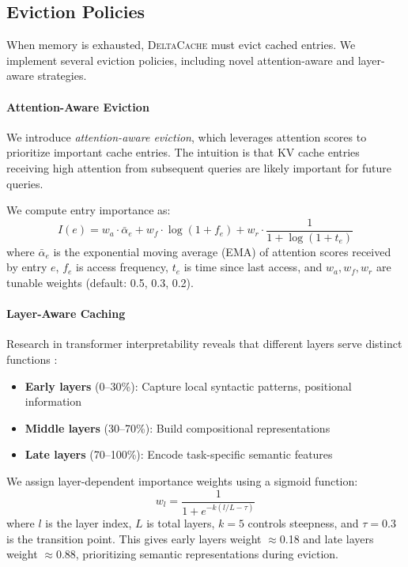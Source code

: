 \documentclass{article}
\newcommand{\deltacache}{\textsc{DeltaCache}}
\begin{document}
\subsection{Eviction Policies}

When memory is exhausted, \deltacache{} must evict cached entries.
We implement several eviction policies, including novel attention-aware and layer-aware strategies.

\paragraph{Attention-Aware Eviction}
We introduce \emph{attention-aware eviction}, which leverages attention scores to prioritize important cache entries.
The intuition is that KV cache entries receiving high attention from subsequent queries are likely important for future queries.

We compute entry importance as:
\begin{equation}
    I(e) = w_a \cdot \bar{\alpha}_e + w_f \cdot \log(1 + f_e) + w_r \cdot \frac{1}{1 + \log(1 + t_e)}
\end{equation}
where $\bar{\alpha}_e$ is the exponential moving average (EMA) of attention scores received by entry $e$, $f_e$ is access frequency, $t_e$ is time since last access, and $w_a, w_f, w_r$ are tunable weights (default: 0.5, 0.3, 0.2).

\paragraph{Layer-Aware Caching}
Research in transformer interpretability reveals that different layers serve distinct functions \citep{rogers2020primer,elhage2021mathematical}:
\begin{itemize}
    \item \textbf{Early layers} (0--30\%): Capture local syntactic patterns, positional information
    \item \textbf{Middle layers} (30--70\%): Build compositional representations
    \item \textbf{Late layers} (70--100\%): Encode task-specific semantic features
\end{itemize}

We assign layer-dependent importance weights using a sigmoid function:
\begin{equation}
    w_l = \frac{1}{1 + e^{-k(l/L - \tau)}}
\end{equation}
where $l$ is the layer index, $L$ is total layers, $k=5$ controls steepness, and $\tau=0.3$ is the transition point.
This gives early layers weight $\approx$0.18 and late layers weight $\approx$0.88, prioritizing semantic representations during eviction.
\end{document}
